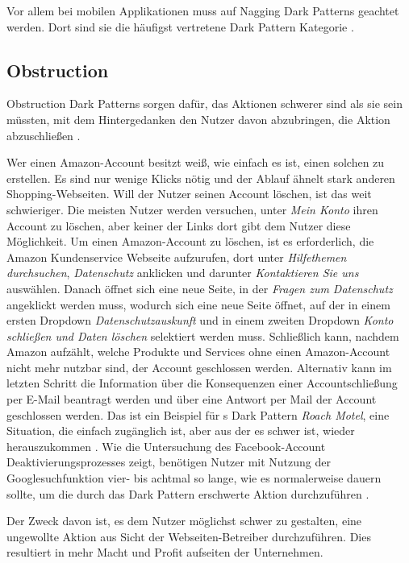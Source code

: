 \documentclass[conference,compsoc,final,a4paper]{IEEEtran}
\begin{document}
Vor allem bei mobilen Applikationen muss auf Nagging Dark Patterns geachtet werden. Dort sind sie die häufigst vertretene Dark Pattern Kategorie \autocite{DiGeronimo2020}.

\subsection{Obstruction}
\label{chap:Obstruction}
Obstruction Dark Patterns sorgen dafür, das Aktionen schwerer sind als sie sein müssten, mit dem Hintergedanken den Nutzer davon abzubringen, die Aktion abzuschließen \autocite{Gray_2018}.

Wer einen Amazon-Account besitzt weiß, wie einfach es ist, einen solchen zu erstellen. Es sind nur wenige Klicks nötig und der Ablauf ähnelt stark anderen Shopping-Webseiten. Will der Nutzer seinen Account löschen, ist das weit schwieriger. Die meisten Nutzer werden versuchen, unter \textit{Mein Konto} ihren Account zu löschen, aber keiner der Links dort gibt dem Nutzer diese Möglichkeit. Um einen Amazon-Account zu löschen, ist es erforderlich, die Amazon Kundenservice Webseite aufzurufen, dort unter \textit{Hilfethemen durchsuchen}, \textit{Datenschutz} anklicken und darunter \textit{Kontaktieren Sie uns} auswählen. Danach öffnet sich eine neue Seite, in der \textit{Fragen zum Datenschutz} angeklickt werden muss, wodurch sich eine neue Seite öffnet, auf der in einem ersten Dropdown \textit{Datenschutzauskunft} und in einem zweiten Dropdown \textit{Konto schließen und Daten löschen} selektiert werden muss. Schließlich kann, nachdem Amazon aufzählt, welche Produkte und Services ohne einen Amazon-Account nicht mehr nutzbar sind, der Account geschlossen werden. Alternativ kann im letzten Schritt die Information über die Konsequenzen einer Accountschließung per E-Mail beantragt werden und über eine Antwort per Mail der Account geschlossen werden. Das ist ein Beispiel für \citeauthor{Brignull}s Dark Pattern \textit{Roach Motel}, eine Situation, die einfach zugänglich ist, aber aus der es schwer ist, wieder herauszukommen \autocite{Brignull}. Wie die Untersuchung des Facebook-Account Deaktivierungsprozesses zeigt, benötigen Nutzer mit Nutzung der Googlesuchfunktion vier- bis achtmal so lange, wie es normalerweise dauern sollte, um die durch das Dark Pattern erschwerte Aktion durchzuführen \autocite{M.Bhoot2020}.

Der Zweck davon ist, es dem Nutzer möglichst schwer zu gestalten, eine ungewollte Aktion aus Sicht der Webseiten-Betreiber durchzuführen. Dies resultiert in mehr Macht und Profit aufseiten der Unternehmen.
\end{document}

